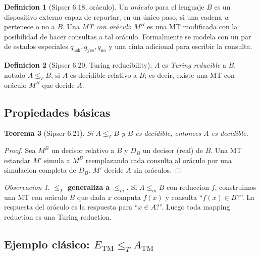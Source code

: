 \documentclass[11pt,a4paper]{article}
\theoremstyle{plain}
\newtheorem{teorema}{Teorema}[section]
\theoremstyle{definition}
\newtheorem{definicion}[teorema]{Definicion}
\theoremstyle{remark}
\newtheorem*{observacion}{Observacion}
\newcommand{\TM}{\mathrm{TM}}
\newcommand{\redm}{\le_{m}}
\newcommand{\redT}{\le_{T}}
\newcommand{\ATM}{A_{\TM}}
\newcommand{\ETM}{E_{\TM}}
\begin{document}
\begin{definicion}[Sipser 6.18, or\'aculo]
Un \emph{or\'aculo} para el lenguaje $B$ es un dispositivo externo capaz de
reportar, en un \'unico paso, si una cadena $w$ pertenece o no a $B$. Una
\emph{MT con or\'aculo} $M^{B}$ es una MT modificada con la posibilidad de
hacer consultas a tal or\'aculo. Formalmente se modela con un par de
estados especiales $q_{\text{ask}},q_{\text{yes}},q_{\text{no}}$ y una cinta
adicional para escribir la consulta.
\end{definicion}

\begin{definicion}[Sipser 6.20, Turing reducibility]
$A$ es \emph{Turing reducible} a $B$, notado $A\redT B$, si $A$ es decidible
relativo a $B$; es decir, existe una MT con or\'aculo $M^{B}$ que decide
$A$.
\end{definicion}

\subsection{Propiedades b\'asicas}

\begin{teorema}[Sipser 6.21]
Si $A\redT B$ y $B$ es decidible, entonces $A$ es decidible.
\end{teorema}

\begin{proof}
Sea $M^{B}$ un decisor relativo a $B$ y $D_B$ un decisor (real) de $B$. Una
MT estandar $M'$ simula a $M^{B}$ reemplazando cada consulta al or\'aculo por
una simulacion completa de $D_B$. $M'$ decide $A$ sin or\'aculos.
\end{proof}

\begin{observacion}
\textbf{$\redT$ generaliza a $\redm$.} Si $A\redm B$ con reduccion $f$,
construimos una MT con or\'aculo $B$ que dada $x$ computa $f(x)$ y consulta
``$f(x)\in B$?''. La respuesta del or\'aculo es la respuesta para
``$x\in A$?''. Luego toda mapping reduction es una Turing reduction.
\end{observacion}

\subsection{Ejemplo cl\'asico: $\ETM \redT \ATM$}
\end{document}
